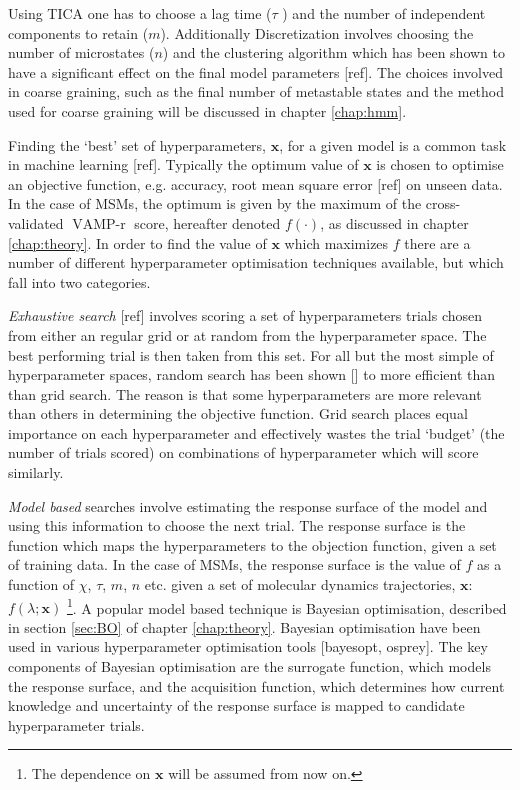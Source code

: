 Using TICA one has to choose a lag time ($\tau$ ) and the number of independent components to retain ($m$). Additionally  Discretization involves choosing the number of microstates ($n$) and the clustering algorithm which has been shown to have a significant effect on the final model parameters [ref].  The choices involved in coarse graining, such as the final number of metastable states and the method used for coarse graining will be discussed in chapter \ref{chap:hmm}. 

Finding the `best' set of hyperparameters, $\mathbf{x}$, for a given model is a common task in machine learning [ref]. Typically the optimum value of $\mathbf{x}$ is chosen to optimise an objective function, e.g. accuracy, root mean square error [ref] on unseen data. In the case of MSMs, the optimum is given by the maximum of the cross-validated $\operatorname{VAMP-r}$ score, hereafter denoted $f(\cdot)$, as discussed in chapter \ref{chap:theory}. In order to find the value of $\mathbf{x}$ which maximizes $f$ there are a number of different hyperparameter optimisation techniques available, but which fall into two categories. 

\emph{Exhaustive search} [ref] involves scoring a set of  hyperparameters trials chosen from either an regular grid or at random from the hyperparameter space. The best performing trial is then taken from this set. For all but the most simple of hyperparameter spaces, random search has been shown [] to more efficient than  than grid search. The reason is that some hyperparameters are more relevant than others in determining the objective function. Grid search places equal importance on each hyperparameter and effectively wastes the trial `budget' (the number of trials scored) on combinations of hyperparameter which will score similarly. 

\emph{Model based} searches involve estimating the response surface of the model and using this information to choose the next trial. The response surface is the function which maps the hyperparameters to the objection function, given a set of training data. In the case of MSMs, the response surface is the value of $f$ as a function of $\chi$, $\tau$, $m$, $n$ etc. given a set of molecular dynamics trajectories, $\mathbf{x}$: $f(\lambda; \mathbf{x})$ \footnote{The dependence on $\mathbf{x}$ will be assumed from now on. }. A popular model based technique is Bayesian optimisation, described in section \ref{sec:BO} of chapter \ref{chap:theory}. Bayesian optimisation have been used in various hyperparameter optimisation tools [bayesopt, osprey].  The key components of Bayesian optimisation are the surrogate function, which models the response surface, and the acquisition function, which determines how current knowledge and uncertainty of the response surface is mapped to candidate hyperparameter trials. 

